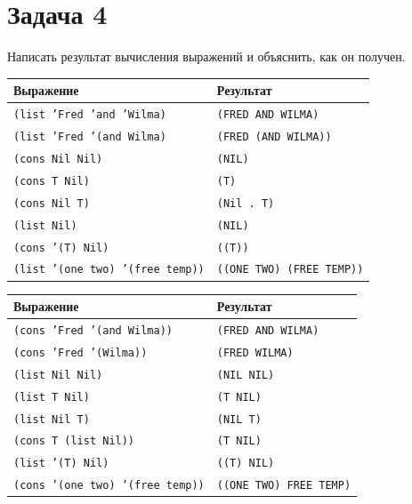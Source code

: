 \section{Задача 4}

Написать результат вычисления выражений и объяснить, как он получен.

\begin{table}
	\begin{center}
		\begin{tabular}{|l|l|}
			\hline
			\textbf{Выражение} & \textbf{Результат} \\
			\hline
			\texttt{(list 'Fred 'and 'Wilma)} & \texttt{(FRED AND WILMA)} \\
			\hline
			\texttt{(list 'Fred '(and Wilma)} & \texttt{(FRED (AND WILMA))} \\
			\hline
			\texttt{(cons Nil Nil)} & \texttt{(NIL)} \\
			\hline
			\texttt{(cons T Nil)} & \texttt{(T)} \\
			\hline
			\texttt{(cons Nil T)} & \texttt{(Nil . T)} \\
			\hline
			\texttt{(list Nil)} & \texttt{(NIL)} \\
			\hline
			\texttt{(cons '(T) Nil)} & \texttt{((T))} \\
			\hline
			\texttt{(list '(one two) '(free temp))} & \texttt{((ONE TWO) (FREE TEMP))} \\
			\hline
		\end{tabular}
	\end{center}
\end{table}

\clearpage

\begin{table}[ht]
	\begin{center}
		\begin{tabular}{|l|l|}
			\hline
			\textbf{Выражение} & \textbf{Результат} \\
			\hline			
			\texttt{(cons 'Fred '(and Wilma))} & \texttt{(FRED AND WILMA)} \\
			\hline
			\texttt{(cons 'Fred '(Wilma))} & \texttt{(FRED WILMA)} \\
			\hline
			\texttt{(list Nil Nil)} & \texttt{(NIL NIL)} \\
			\hline
			\texttt{(list T Nil)} & \texttt{(T NIL)} \\
			\hline
			\texttt{(list Nil T)} & \texttt{(NIL T)} \\
			\hline
			\texttt{(cons T (list Nil))} & \texttt{(T NIL)} \\
			\hline
			\texttt{(list '(T) Nil)} & \texttt{((T) NIL)} \\
			\hline
			\texttt{(cons '(one two) '(free temp))} & \texttt{((ONE TWO) FREE TEMP)} \\
			\hline
		\end{tabular}
	\end{center}
\end{table}


